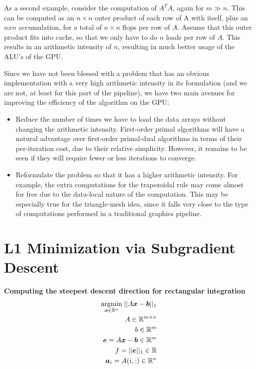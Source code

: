 As a second example, consider the computation of $A^T A$, again for $m \gg n$.
This can be computed as an $n \times n$ outer product of each row of A with
itself, plus an $n x n$ accumulation, for a total of $n \times n$ flops per row
of $A$.  Assume that this outer product fits into cache, so that we only have
to do $n$ loads per row of $A$.  This results in an arithmetic intensity of
$n$, resulting in much better usage of the ALU's of the GPU.

Since we have not been blessed with a problem that has an obvious
implementation with a very high arithmetic intensity in its formulation (and we
are not, at least for this part of the pipeline), we have two main avenues for
improving the efficiency of the algorithm on the GPU:

\begin{itemize}
\item Reduce the number of times we have to load the data arrays without
changing the arithmetic intensity.  First-order primal algorithms will have a
natural advantage over first-order primal-dual algorithms in terms of their
per-iteration cost, due to their relative simplicity.  However, it remains to
be seen if they will require fewer or less iterations to converge.

\item Reformulate the problem so that it has a higher arithmetic intensity.
For example, the extra computations for the trapezoidal rule may come almost
for free due to the data-local nature of the computation.  This may be
especially true for the triangle-mesh idea, since it falls very close to the
type of computations performed in a traditional graphics pipeline.

\end{itemize}

\section{L1 Minimization via Subgradient Descent} %
{\bf Computing the steepest descent direction for rectangular integration }
\begin{eqnarray}
{\hbox{$\underset{{\boldsymbol{x}}\in \mathbb R^n}{\mbox{argmin}}\;$}} ||A {\boldsymbol{x}} - \boldsymbol{b}||_1 \\
A \in \mathbb R^{m \times n}\\
b \in \mathbb R^m \\
\boldsymbol{e} = A {\boldsymbol{x}} - \boldsymbol{b} \in \mathbb R^m\\
f = ||\boldsymbol{e}||_1 \in \mathbb R \\
\boldsymbol{a}_i = A(i,:) \in \mathbb R^{n}\\
\end{eqnarray}

